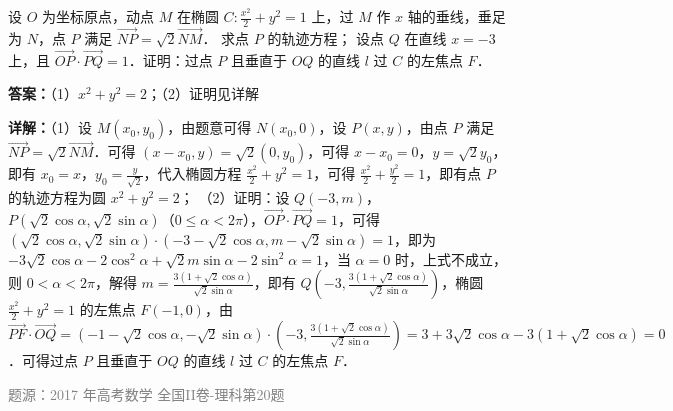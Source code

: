 
\begin{question}
设 $O$ 为坐标原点，动点 $M$ 在椭圆 $C:\frac{x^2}{2}+y^2=1$ 上，过 $M$ 作 $x$ 轴的垂线，垂足为 $N$，点 $P$ 满足 $\overrightarrow{NP}=\sqrt{2}\overrightarrow{NM}$．
求点 $P$ 的轨迹方程；
设点 $Q$ 在直线 $x=-3$ 上，且 $\overrightarrow{OP}\cdot\overrightarrow{PQ}=1$．证明：过点 $P$ 且垂直于 $OQ$ 的直线 $l$ 过 $C$ 的左焦点 $F$．
\begin{solution}
\textbf{答案：}（1）$x^2+y^2=2$；（2）证明见详解

\textbf{详解：}（1）设 $M(x_0,y_0)$，由题意可得 $N(x_0,0)$，设 $P(x,y)$，由点 $P$ 满足 $\overrightarrow{NP}=\sqrt{2}\overrightarrow{NM}$．可得 $(x-x_0,y)=\sqrt{2}(0,y_0)$，可得 $x-x_0=0$，$y=\sqrt{2}y_0$，即有 $x_0=x$，$y_0=\frac{y}{\sqrt{2}}$，代入椭圆方程 $\frac{x^2}{2}+y^2=1$，可得 $\frac{x^2}{2}+\frac{y^2}{2}=1$，即有点 $P$ 的轨迹方程为圆 $x^2+y^2=2$；
（2）证明：设 $Q(-3,m)$，$P(\sqrt{2}\cos\alpha,\sqrt{2}\sin\alpha)$（$0\le\alpha<2\pi$），$\overrightarrow{OP}\cdot\overrightarrow{PQ}=1$，可得 $(\sqrt{2}\cos\alpha,\sqrt{2}\sin\alpha)\cdot(-3-\sqrt{2}\cos\alpha,m-\sqrt{2}\sin\alpha)=1$，即为 $-3\sqrt{2}\cos\alpha-2\cos^2\alpha+\sqrt{2}m\sin\alpha-2\sin^2\alpha=1$，当 $\alpha=0$ 时，上式不成立，则 $0<\alpha<2\pi$，解得 $m=\frac{3(1+\sqrt{2}\cos\alpha)}{\sqrt{2}\sin\alpha}$，即有 $Q(-3,\frac{3(1+\sqrt{2}\cos\alpha)}{\sqrt{2}\sin\alpha})$，椭圆 $\frac{x^2}{2}+y^2=1$ 的左焦点 $F(-1,0)$，由 $\overrightarrow{PF}\cdot\overrightarrow{OQ}=(-1-\sqrt{2}\cos\alpha,-\sqrt{2}\sin\alpha)\cdot(-3,\frac{3(1+\sqrt{2}\cos\alpha)}{\sqrt{2}\sin\alpha})=3+3\sqrt{2}\cos\alpha-3(1+\sqrt{2}\cos\alpha)=0$．可得过点 $P$ 且垂直于 $OQ$ 的直线 $l$ 过 $C$ 的左焦点 $F$．

\textcolor{gray}{\footnotesize 题源：2017 年高考数学 全国II卷-理科第20题}
\end{solution}
\end{question}

